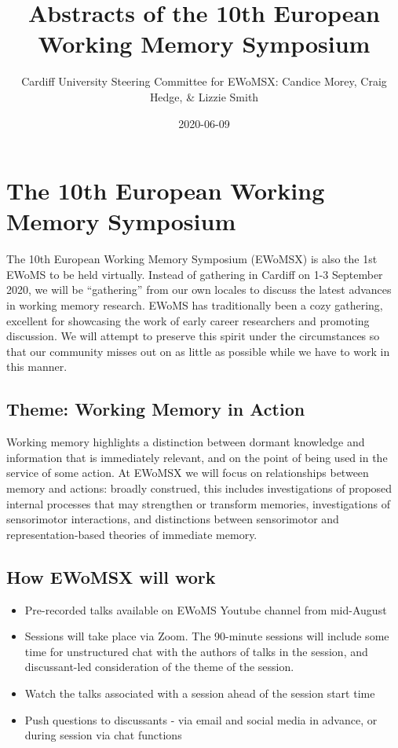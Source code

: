\documentclass[12pt,]{book}
\title{Abstracts of the 10th European Working Memory Symposium}
\author{Cardiff University Steering Committee for EWoMSX: Candice Morey, Craig Hedge, \& Lizzie Smith}
\date{2020-06-09}
\begin{document}
\maketitle

{
\setcounter{tocdepth}{1}
\tableofcontents
}
\hypertarget{the-10th-european-working-memory-symposium}{%
\chapter{The 10th European Working Memory Symposium}\label{the-10th-european-working-memory-symposium}}

The 10th European Working Memory Symposium (EWoMSX) is also the 1st EWoMS to be held virtually. Instead of gathering in Cardiff on 1-3 September 2020, we will be ``gathering'' from our own locales to discuss the latest advances in working memory research. EWoMS has traditionally been a cozy gathering, excellent for showcasing the work of early career researchers and promoting discussion. We will attempt to preserve this spirit under the circumstances so that our community misses out on as little as possible while we have to work in this manner.

\hypertarget{theme-working-memory-in-action}{%
\section{Theme: Working Memory in Action}\label{theme-working-memory-in-action}}

Working memory highlights a distinction between dormant knowledge and information that is immediately relevant, and on the point of being used in the service of some action. At EWoMSX we will focus on relationships between memory and actions: broadly construed, this includes investigations of proposed internal processes that may strengthen or transform memories, investigations of sensorimotor interactions, and distinctions between sensorimotor and representation-based theories of immediate memory.

\hypertarget{how-ewomsx-will-work}{%
\section{How EWoMSX will work}\label{how-ewomsx-will-work}}

\begin{itemize}
\item
  Pre-recorded talks available on EWoMS Youtube channel from mid-August
\item
  Sessions will take place via Zoom. The 90-minute sessions will include some time for unstructured chat with the authors of talks in the session, and discussant-led consideration of the theme of the session.
\item
  Watch the talks associated with a session ahead of the session start time
\item
  Push questions to discussants - via email and social media in advance, or during session via chat functions
\end{itemize}
\end{document}

